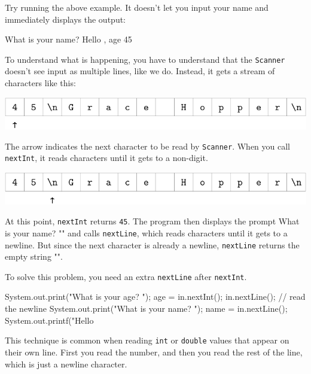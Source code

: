 \documentclass[12pt]{book}
\theoremstyle{exercise}
\newcommand{\java}[1]{\verb"#1"}
\newcommand{\java}[1]{\lstinline{#1}} %
\begin{document}
Try running the above example.
It doesn't let you input your name and immediately displays the output:

\begin{stdout}
What is your name? Hello , age 45
\end{stdout}

To understand what is happening, you have to understand that the \java{Scanner} doesn't see input as multiple lines, like we do.
Instead, it gets a stream of characters like this:

\begin{center}
\includegraphics{figs/hopper1.pdf}
\end{center}

The arrow indicates the next character to be read by \java{Scanner}.
When you call \java{nextInt}, it reads characters until it gets to a non-digit.

\begin{center}
\includegraphics{figs/hopper2.pdf}
\end{center}

At this point, \java{nextInt} returns \java{45}.
The program then displays the prompt \java{"What is your name? "} and calls \java{nextLine}, which reads characters until it gets to a newline.
But since the next character is already a newline, \java{nextLine} returns the empty string \java{""}.

To solve this problem, you need an extra \java{nextLine} after \java{nextInt}.

\begin{code}
    System.out.print("What is your age? ");
    age = in.nextInt();
    in.nextLine();  // read the newline
    System.out.print("What is your name? ");
    name = in.nextLine();
    System.out.printf("Hello %
\end{code}

This technique is common when reading \java{int} or \java{double} values that appear on their own line.
First you read the number, and then you read the rest of the line, which is just a newline character.


\end{document}
